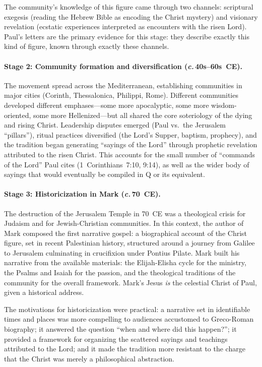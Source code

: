 \documentclass[12pt,oneside]{article}
\newcommand{\circa}{\textit{c.}\,}
\begin{document}
The community's knowledge of this figure came through two channels:
scriptural exegesis (reading the Hebrew Bible as encoding the Christ
mystery) and visionary revelation (ecstatic experiences interpreted as
encounters with the risen Lord).  Paul's letters are the primary
evidence for this stage: they describe exactly this kind of figure,
known through exactly these channels.

\paragraph{Stage 2: Community formation and diversification
(\circa 40s--60s~CE).}
The movement spread across the Mediterranean, establishing communities
in major cities (Corinth, Thessalonica, Philippi, Rome).  Different
communities developed different emphases---some more
apocalyptic, some more wisdom-oriented, some more Hellenized---but all
shared the core soteriology of the dying and rising Christ.  Leadership
disputes emerged (Paul vs.\ the Jerusalem ``pillars''), ritual practices
diversified (the Lord's Supper, baptism, prophecy), and the tradition
began generating ``sayings of the Lord'' through prophetic revelation
attributed to the risen Christ.  This accounts for the small number of
``commands of the Lord'' Paul cites (1~Corinthians~7:10, 9:14), as well
as the wider body of sayings that would eventually be compiled in Q or
its equivalent.

\paragraph{Stage 3: Historicization in Mark (\circa 70~CE).}
The destruction of the Jerusalem Temple in 70~CE was a theological
crisis for Judaism and for Jewish-Christian communities.  In this
context, the author of Mark composed the first narrative gospel: a
biographical account of the Christ figure, set in recent Palestinian
history, structured around a journey from Galilee to Jerusalem
culminating in crucifixion under Pontius Pilate.  Mark built his
narrative from the available materials: the Elijah-Elisha cycle for the
ministry, the Psalms and Isaiah for the passion, and the theological
traditions of the community for the overall framework.  Mark's Jesus
\textit{is} the celestial Christ of Paul, given a historical address.

The motivations for historicization were practical: a narrative set in
identifiable times and places was more compelling to audiences
accustomed to Greco-Roman biography; it answered the question ``when and
where did this happen?''; it provided a framework for organizing the
scattered sayings and teachings attributed to the Lord; and it made the
tradition more resistant to the charge that the Christ was merely a
philosophical abstraction.
\end{document}
